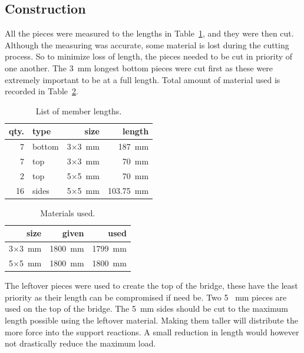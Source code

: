 \documentclass[12pt]{article}
\begin{document}
\subsection{Construction}
All the pieces were measured to the lengths in Table~\ref{list}, and they were then cut. Although the measuring was accurate, some material is lost during the cutting process. So to minimize loss of length, the pieces needed to be cut in priority of one another. The 3~mm longest bottom pieces were cut first as these were extremely important to be at a full length. Total amount of material used is recorded in Table~\ref{materials}.
		\begin{table}[h!]
			\caption{List of member lengths.}
			\begin{center}
			\begin{tabular}{ | r | l | r | r | }
				\hline
				qty. & type & size & length \\ \hline
				7 & bottom & 3$\times$3~mm & 187~mm \\ \hline
				7 & top & 3$\times$3~mm & 70~mm \\ \hline
				2 & top & 5$\times$5~mm & 70~mm \\ \hline
				16 & sides & 5$\times$5~mm & 103.75~mm \\ \hline
			\end{tabular}
			\end{center}
			\label{list}
		\end{table}
		\begin{table}[h!]
			\caption{Materials used.}
			\begin{center}
			\begin{tabular}{ | r | r | r | }
				\hline
				size & given & used \\ \hline
				3$\times$3~mm & 1800~mm & 1799~mm \\ \hline
				5$\times$5~mm & 1800~mm & 1800~mm \\ \hline
			\end{tabular}
			\end{center}
			\label{materials}
		\end{table}

The leftover pieces were used to create the top of the bridge, these have the least priority as their length can be compromised if need be. Two 5 ~mm pieces are used on the top of the bridge. The 5~mm sides should be cut to the maximum length possible using the leftover material. Making them taller will distribute the more force into the support reactions. A small reduction in length would however not drastically reduce the maximum load. 
\end{document}
